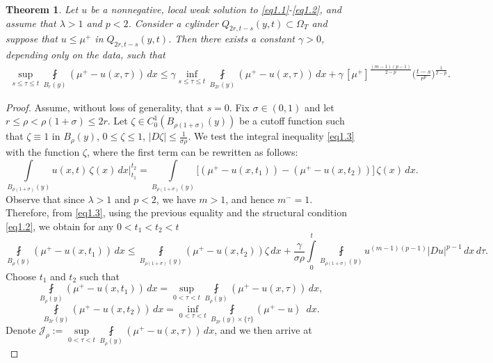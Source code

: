 \documentclass[a4paper,11pt,fullpage]{article}
\numberwithin{equation}{section}
\newtheorem{theorem}{Theorem}[section]
\begin{document}
\begin{theorem}\label{lem3.2}
Let $u$ be a nonnegative, local weak solution to \eqref{eq1.1}-\eqref{eq1.2}, and assume that $\lambda>1$ and $p<2$. Consider a cylinder $Q_{2r,t-s}(y,t)\subset\Omega_T$ and suppose that $u\leqslant\mu^{+}$ in $Q_{2r,t-s}(y,t)$.
Then there exists a constant $\gamma>0$, depending only on the data, such that
\begin{multline}\label{eq3.3}
\sup\limits_{s\leqslant \tau\leqslant t}\fint\limits_{B_{r}(y)}(\mu^+-u(x, \tau))\, dx \leqslant \gamma
\inf\limits_{s\leqslant\tau \leqslant t}\fint\limits_{B_{2 r}(y)} (\mu^+-u(x, \tau))\,dx +\gamma \,
[\mu^+]^\frac{(m-1)(p-1)}{2-p}\Big(\frac{t-s}{r^{p}}\Big)^{\frac{1}{2-p}}.
\end{multline}
\end{theorem}
\begin{proof}
Assume, without loss of generality, that $s=0$. 
Fix $\sigma \in (0,1)$ and let $r \leqslant \rho < \rho(1+\sigma) \leqslant 2r$.
Let $\zeta \in C_0^1(B_{\rho(1+\sigma)}(y))$ be a cutoff function such that $\zeta \equiv 1$ in $B_\rho(y)$, $0 \leqslant \zeta \leqslant 1$, $|D\zeta| \leqslant \frac{1}{\sigma\rho}$. 
We test the integral inequality \eqref{eq1.3} with the function $\zeta$, where the first term can be rewritten as follows:
$$
\int\limits_{B_{\rho(1+\sigma)}(y)} u(x,t)\,\zeta(x)\,dx \Big|_{t_1}^{t_2}=
\int\limits_{B_{\rho(1+\sigma)}(y)}
\big[(\mu^+ - u(x,t_1))-(\mu^+ - u(x,t_2))\big]
\,\zeta(x)\,dx. 
$$
Observe that since $\lambda>1$ and $p<2$, we have $m>1$, and hence $m^-=1$. Therefore, from \eqref{eq1.3}, using the previous equality and the structural condition \eqref{eq1.2}, we obtain for any $0<t_1<t_2<t$
\begin{equation*}
\fint\limits_{B_{\rho}(y)}(\mu^+ - u(x,t_1))\,dx
\leqslant
\fint\limits_{B_{\rho(1+\sigma)}(y)}(\mu^+ - u(x,t_2))\zeta\,dx
+
\frac{\gamma}{\sigma \rho}
\int\limits_{0}^{t}\fint\limits_{B_{\rho(1+\sigma)}(y)}
u^{(m-1)(p-1)}
|D u|^{p-1}\,dx\,d\tau .
\end{equation*}
Choose $t_1$ and $t_2$ such that
$$
\fint\limits_{B_{\rho}(y)}(\mu^+ - u(x,t_1))\,dx=\sup\limits_{0<\tau<t} \fint\limits_{B_{\rho}(y)} (\mu^+ - u(x,\tau))\, dx,
$$
$$
\fint\limits_{B_{2r}(y)} (\mu^+ - u(x,t_2))\,dx= \inf\limits_{0<\tau<t} \fint\limits_{B_{2r}(y)\times\{\tau\}} (\mu^+ - u)\,\,\,dx.
$$
Denote $\mathcal{J}_{\rho} := \sup\limits_{0<\tau<t} \fint\limits_{B_{\rho}(y)} (\mu^+ - u(x,\tau))\, dx$, and we then arrive at
\begin{equation}\label{pre-recurs_ineq_deg}

\end{equation}
\end{proof}
\end{document}
